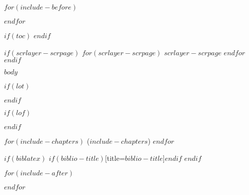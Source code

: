 \documentclass[$if(fontsize)$$fontsize$,$endif$$if(lang)$$lang$,$endif$$if(papersize)$$papersize$,$endif$$for(classoption)$$classoption$$sep$,$endfor$]{$documentclass$}
\begin{document}
\frontmatter

$for(include-before)$
  
$endfor$

\clearpage

$if(toc)$
  \renewcommand*\contentsname{Inhaltsverzeichnis}
  \hypersetup{linkcolor=black}
    \setcounter{tocdepth}{$toc-depth$}
    \tableofcontents
    \pagestyle{plain}
    \cleardoublepage
$endif$


$if(scrlayer-scrpage)$
  $for(scrlayer-scrpage)$
    $scrlayer-scrpage$
  $endfor$
$endif$

\mainmatter

$body$

$if(lot)$
  \renewcommand*\listtablename{Tabellenverzeichnis}
    \listoftables
  \restoregeometry
  \clearpage
$endif$

$if(lof)$
  \renewcommand*\listfigurename{Abbildungsverzeichnis}
    \listoffigures
  \restoregeometry
$endif$

$for(include-chapters)$
  ($include-chapters$)
$endfor$

$if(biblatex)$
  \printbibliography$if(biblio-title)$[title=$biblio-title$]$endif$
$endif$

\backmatter

$for(include-after)$
  
$endfor$
\end{document}
